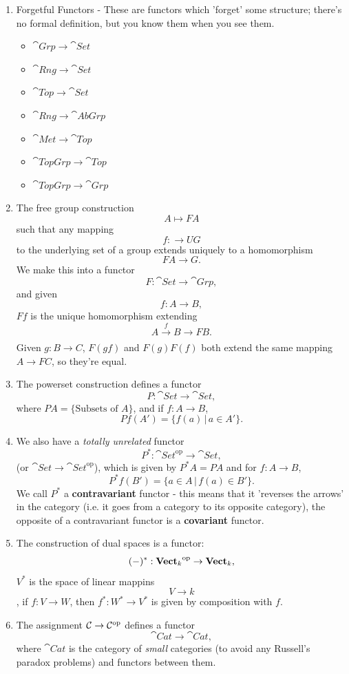 \documentclass{article}
\begin{document}
\begin{enumerate}
    \item[(a)] Forgetful Functors - These are functors which 'forget' some structure; there's no formal definition, but you know them when you see them.
    \begin{itemize}
        \item $\cat{Grp} \to \cat{Set}$
        \item $\cat{Rng} \to \cat{Set}$
        \item $\cat{Top} \to \cat{Set}$
        \item $\cat{Rng} \to \cat{AbGrp}$
        \item $\cat{Met} \to \cat{Top}$
        \item $\cat{TopGrp} \to \cat{Top}$
        \item $\cat{TopGrp} \to \cat{Grp}$
    \end{itemize}
    \item[(b)] The free group construction \[ A \mapsto FA \] such that any mapping \[ f : \to UG \] to the underlying set of a group extends uniquely to a homomorphism \[ FA \to G.\] We make this into a functor \[ F: \cat{Set} \to \cat{Grp}, \] and given \[ f : A \to B, \] $Ff$ is the unique homomorphism extending \[ A \xrightarrow[]{f}  B \to FB. \] Given $g: B \to C$, $F(gf)$ and $F(g)F(f)$ both extend the same mapping $A \to FC$, so they're equal.
    \item[(c)] The powerset construction defines a functor \[ P : \cat{Set} \to \cat{Set}, \] where $PA = \{ \text{Subsets of } A \}$, and if $f: A \to B$, \[Pf(A') = \{f(a) \, | \, a \in A'\}.\]
    \item[(d)] We also have a \textit{totally unrelated} functor \[P^{*} : \cat{Set}^{\text{op}} \to \cat{Set},\] (or $\cat{Set} \to \cat{Set}^{\text{op}}$), which is given by $P^{*}A = PA$ and for $f : A \to B$, \[ P^{*}f(B') = \{a \in A \, | \, f(a) \in B'\}. \] We call $P^{*}$ a \textbf{contravariant} functor - this means that it 'reverses the arrows' in the category (i.e. it goes from a category to its opposite category), the opposite of a contravariant functor is a \textbf{covariant} functor.
    \item[(e)] The construction of dual spaces is a functor: \[ (-)^{*}: \textbf{Vect$_{k}$}^{\text{op}} \to \textbf{Vect$_{k}$},\] $V^{*}$ is the space of linear mappins \[ V \to k \], if $f: V \to W$, then $f^{*}: W^{*} \to V^{*}$ is given by composition with $f$.
    \item[(f)] The assignment $\mathcal{C} \to \mathcal{C}^{\text{op}}$ defines a functor \[ \cat{Cat} \to \cat{Cat}, \] where $\cat{Cat}$ is the category of \textit{small} categories (to avoid any Russell's paradox problems) and functors between them.

\end{enumerate}
\end{document}
